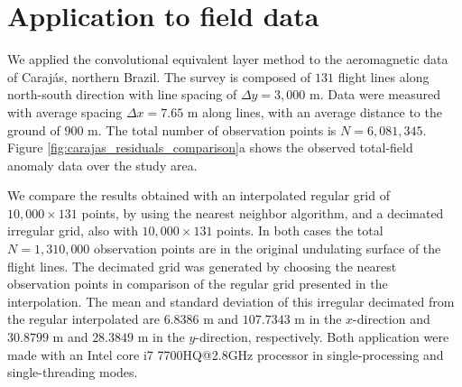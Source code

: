 \documentclass[manuscript]{geophysics}
\begin{document}
\section{Application to field data}

We applied the convolutional equivalent layer method to the aeromagnetic data of Carajás, 
northern Brazil.
The survey is composed of $131$ flight lines along north-south direction with line spacing of 
$\Delta y = 3,000$ m. 
Data were measured with average spacing $\Delta x = 7.65$ m along lines,
with an average distance to the ground of $900$ m. 
The total number of observation points is $N = 6,081,345$. Figure \ref{fig:carajas_residuals_comparison}a
shows the observed total-field anomaly data over the study area.

We compare the results obtained with an interpolated regular grid of $10,000 \times 131$ points, 
by using the nearest neighbor algorithm, and a decimated irregular grid, also with $10,000 \times 131$
points. In both cases the total $N = 1,310,000$ observation points are in the original undulating surface of the flight lines. 
The decimated grid was generated by 
choosing the nearest observation points in comparison of the regular grid presented in the interpolation.
The mean and standard deviation of this irregular decimated from the regular interpolated are $6.8386$ m and $107.7343$ m in the $x$-direction and $30.8799$ m and $28.3849$ m in the $y$-direction, respectively.
Both application were made with an Intel core i7 7700HQ@2.8GHz processor in single-processing and 
single-threading modes. 
\end{document}
